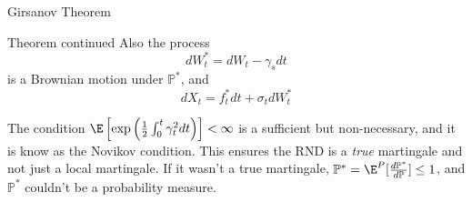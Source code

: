 \documentclass{beamer}
\begin{document}
\begin{frame}{Girsanov Theorem}
	\begin{block}{Theorem continued}
		Also the process
		\begin{equation}
			dW^*_t = dW_t -\gamma_s dt
		\end{equation}
		is a Brownian motion under $\mathbb{P}^*$, and
		\begin{equation*}
			dX_t = f^*_t dt + \sigma_t dW^*_t
		\end{equation*}
	\end{block}
	\vfill
	\begin{tcolorbox}[colback=gray!5, colframe=maincolor, arc=0mm, boxrule=0.5pt]
	\footnotesize
	The condition $\E\left[\exp\left(\frac{1}{2}\int_0^t\gamma_t^2dt\right)\right]<\infty$ is a sufficient but non-necessary, and it is know as the \textcolor{maincolor}{Novikov condition}.
	This ensures the RND is a \emph{true} martingale and not just a local martingale.
	If it wasn't a true martingale, $\mathbb{P}^* =\E^{P}[\frac{d\mathbb{P}^*}{d\mathbb{P}}]\leq 1$, and $\mathbb{P}^*$ couldn't be a probability measure.
	\end{tcolorbox}
\end{frame}
\end{document}
